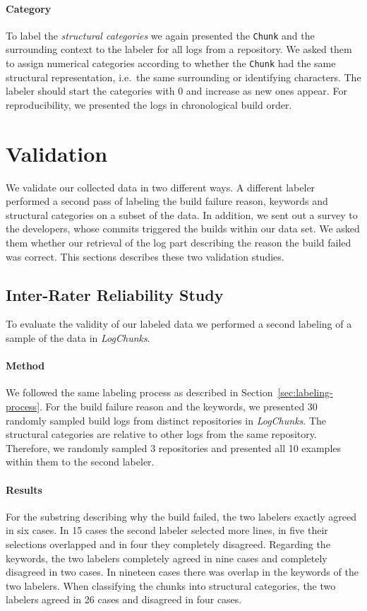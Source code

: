 \documentclass[\myrootdir/main.tex]{subfiles}
\begin{document}
\paragraph{Category}
To label the \emph{structural categories} we again presented the \texttt{Chunk} and the surrounding context to the labeler for all logs from a repository.
We asked them to assign numerical categories according to whether the \texttt{Chunk} had the same structural representation, i.e.\ the same surrounding or identifying characters.
The labeler should start the categories with 0 and increase as new ones appear.
For reproducibility, we presented the logs in chronological build order.

\section{Validation}
We validate our collected data in two different ways.
A different labeler performed a second pass of labeling the build failure reason, keywords and structural categories on a subset of the data.
In addition, we sent out a survey to the developers, whose commits triggered the builds within our data set.
We asked them whether our retrieval of the log part describing the reason the build failed was correct.
This sections describes these two validation studies.

\subsection{Inter-Rater Reliability Study}
To evaluate the validity of our labeled data we performed a second labeling of a sample of the data in \emph{LogChunks}.

\paragraph{Method}
We followed the same labeling process as described in Section~\ref{sec:labeling-process}.
For the build failure reason and the keywords, we presented 30 randomly sampled build logs from distinct repositories in \emph{LogChunks}.
The structural categories are relative to other logs from the same repository.
Therefore, we randomly sampled 3 repositories and presented all 10 examples within them to the second labeler.

\paragraph{Results}
For the substring describing why the build failed, the two labelers exactly agreed in six cases.
In 15 cases the second labeler selected more lines, in five their selections overlapped and in four they completely disagreed.
Regarding the keywords, the two labelers completely agreed in nine cases and completely disagreed in two cases.
In nineteen cases there was overlap in the keywords of the two labelers.%
When classifying the chunks into structural categories, the two labelers agreed in 26 cases and disagreed in four cases.
\end{document}
